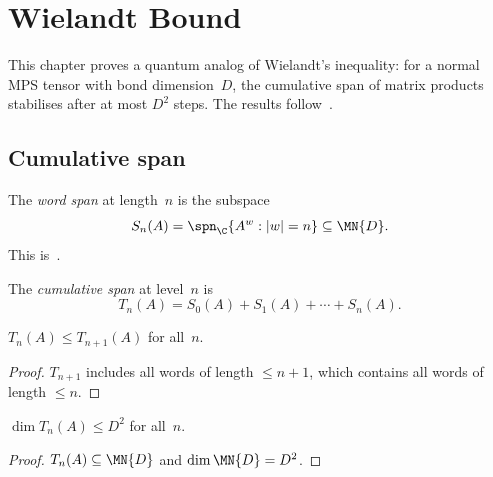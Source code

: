 \chapter{Wielandt Bound}\label{ch:wielandt}

This chapter proves a quantum analog of Wielandt's inequality:
for a normal MPS tensor with bond dimension~$D$,
the cumulative span of matrix products stabilises
after at most $D^2$ steps.
The results follow~\cite{Sanz2010Quantum}.

\section{Cumulative span}

\begin{definition}\label{def:word_span}
    \leanok
    The \emph{word span} at length~$n$ is the subspace
    \[
        S_n(A) =  \spn_{\C}\{A^w : |w| = n\}
        \subseteq  \MN{D}.
    \]
    This is~\cite[Section~II]{Sanz2010Quantum}.
\end{definition}

\begin{definition}\label{def:cumulative_span}
    \leanok
    The \emph{cumulative span} at level~$n$ is
    \[
        T_n(A) =  S_0(A) + S_1(A) + \cdots + S_n(A).
    \]
\end{definition}

\begin{lemma}\label{lem:cumulative_mono}
    \leanok
    $T_n(A) \le T_{n+1}(A)$ for all~$n$.
\end{lemma}

\begin{proof}\leanok{}
    $T_{n+1}$ includes all words of length $\le n+1$,
    which contains all words of length $\le n$.
\end{proof}

\begin{lemma}\label{lem:cumulative_finrank_le}
    \leanok
    $\dim T_n(A) \le D^2$ for all~$n$.
\end{lemma}

\begin{proof}\leanok
    $T_n(A) \subseteq \MN{D}$ and $\dim \MN{D} = D^2$.
\end{proof}

